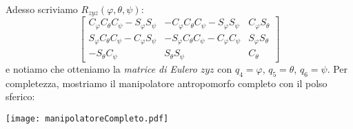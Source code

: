 Adesso scriviamo $R_{zyz}(\varphi,\theta,\psi)$:
\begin{equation}
	\begin{bmatrix}
		C_{\varphi}C_{\theta}C_{\psi} - S_{\varphi}S_{\psi} & -C_{\varphi}C_{\theta}C_{\psi} - S_{\varphi}S_{\psi} & C_{\varphi}S_{\theta} \\
		S_{\varphi}C_{\theta}C_{\psi} - C_{\varphi}S_{\psi} & -S_{\varphi}C_{\theta}C_{\psi} - C_{\varphi}C_{\psi} & S_{\varphi}S_{\theta} \\
		-S_{\theta}C_{\psi} & S_{\theta}S_{\psi} & C_{\theta}
	\end{bmatrix}
\end{equation}
e notiamo che otteniamo la \emph{matrice di Eulero} $zyz$ con $q_4 = \varphi$, $q_5 = \theta$, $q_6 = \psi$.
\newpage
Per completezza, mostriamo il manipolatore antropomorfo completo con il polso sferico:\\
\begin{center}
\texttt{[image: manipolatoreCompleto.pdf]}
\end{center}